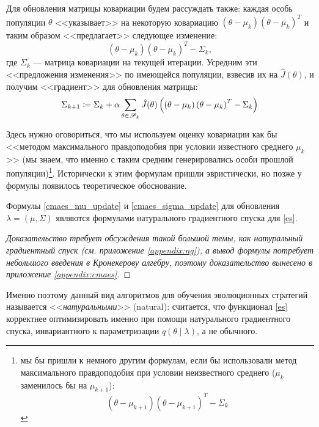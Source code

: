 Для обновления матрицы ковариации будем рассуждать также: каждая особь популяции $\theta$ <<указывает>> на некоторую ковариацию $\left( \theta - \mu_k \right)\left( \theta - \mu_k \right)^T$ и таким образом <<предлагает>> следующее изменение:
$$\left( \theta - \mu_k \right)\left( \theta - \mu_k \right)^T - \Sigma_k,$$
где $\Sigma_k$ --- матрица ковариации на текущей итерации. Усредним эти <<предложения изменения>> по имеющейся популяции, взвесив их на $\hat{J}(\theta)$, и получим <<градиент>> для обновления матрицы:
\begin{equation}\label{cmaes_sigma_update}
\Sigma_{k+1} \coloneqq \Sigma_k + \alpha \sum_{\theta \in \mathscr{P}_k} \hat{J}(\theta) \left( \left( \theta - \mu_k \right)\left( \theta - \mu_k \right)^T - \Sigma_k \right)
\end{equation}

Здесь нужно оговориться, что мы используем оценку ковариации как бы <<методом максимального правдоподобия при условии известного среднего $\mu_k$>> (мы знаем, что именно с таким средним генерировались особи прошлой популяции)\footnote{мы бы пришли к немного другим формулам, если бы использовали метод максимального правдоподобия при условии неизвестного среднего ($\mu_k$ заменилось бы на $\mu_{k+1}$):
$$\left( \theta - \mu_{k+1} \right)\left( \theta - \mu_{k+1} \right)^T - \Sigma_k$$}. Исторически к этим формулам пришли эвристически, но позже у формулы появилось теоретическое обоснование.

\begin{theorem}
Формулы \eqref{cmaes_mu_update} и \eqref{cmaes_sigma_update} для обновления $\lambda = (\mu, \Sigma)$ являются формулами натурального градиентного спуска для \eqref{es}.
\begin{proof}[Доказательство требует обсуждения такой большой темы, как натуральный градиентный спуск (см. приложение \ref{appendix:ng}), а вывод формулы потребует небольшого введения в Кронекерову алгебру, поэтому доказательство вынесено в приложение \ref{appendix:cmaes}] 
\end{proof}
\end{theorem}

Именно поэтому данный вид алгоритмов для обучения эволюционных стратегий называется <<\emph{натуральными}>> (natural): считается, что функционал \eqref{es} корректнее оптимизировать именно при помощи натурального градиентного спуска, инвариантного к параметризации $q(\theta \mid \lambda)$, а не обычного.

\begin{example}
\begin{center}
\end{center}
\end{example}

